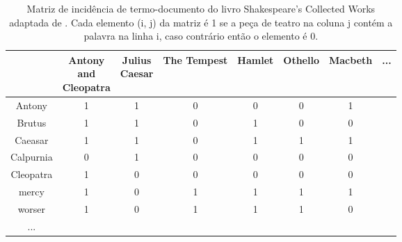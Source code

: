 \begin{table}[H]
    \centering
    \begin{tabular}{|c|c|c|c|c|c|c|c}\hline
         \diagbox{Palavra}{\raisebox{-1.27cm}{\rotatebox{90}{\parbox{1.6cm}{\centering Peça \\ de teatro}}}} & \makecell{Antony \\ and \\ Cleopatra} & \makecell{Julius \\ Caesar} & The Tempest & Hamlet & Othello & Macbeth & ... \\ \hline
         Antony     & 1 & 1 & 0 & 0 & 0 & 1 & \\
         Brutus     & 1 & 1 & 0 & 1 & 0 & 0 & \\
         Caeasar    & 1 & 1 & 0 & 1 & 1 & 1 & \\
         Calpurnia  & 0 & 1 & 0 & 0 & 0 & 0 & \\
         Cleopatra  & 1 & 0 & 0 & 0 & 0 & 0 & \\
         mercy      & 1 & 0 & 1 & 1 & 1 & 1 & \\
         worser     & 1 & 0 & 1 & 1 & 1 & 0 & \\
         ...        & & & & & & & 
    \end{tabular}
    \caption{Matriz de incidência de termo-documento do livro Shakespeare’s Collected Works adaptada de . Cada elemento (i, j) da matriz é 1 se a peça de teatro na coluna j contém a palavra na linha i, caso contrário então o elemento é 0.}
    \label{tab:matriz-incidência-termo-documento}
\end{table}